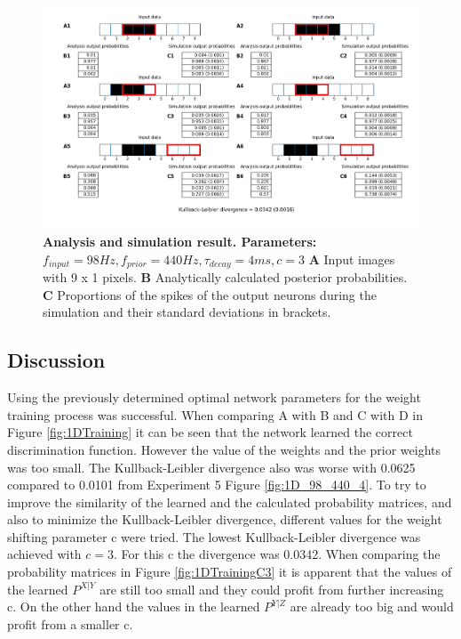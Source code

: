 \begin{figure}
  \includegraphics[width=\linewidth]{figures/1D/training/trainingEvaluation_98_440_4_c3.png}
  \caption{\textbf{Analysis and simulation result. Parameters: } $f_{input} = 98 Hz, f_{prior} = 440 Hz, \tau_{decay} = 4 ms, c = 3$ \textbf{A} Input images with 9 x 1 pixels. \textbf{B} Analytically calculated posterior probabilities. \textbf{C} Proportions of the spikes of the output neurons during the simulation and their standard deviations in brackets.}
  \label{fig:1DTrainingEvaluationC3}
\end{figure}

\subsection{Discussion}

Using the previously determined optimal network parameters for the weight training process was successful. When comparing A with B and C with D in Figure \ref{fig:1DTraining} it can be seen that the network learned the correct discrimination function. However the value of the weights and the prior weights was too small. The Kullback-Leibler divergence also was worse with 0.0625 compared to 0.0101 from Experiment 5 Figure \ref{fig:1D_98_440_4}.
To try to improve the similarity of the learned and the calculated probability matrices, and also to minimize the Kullback-Leibler divergence, different values for the weight shifting parameter c were tried. The lowest Kullback-Leibler divergence was achieved with $c = 3$. For this c the divergence was 0.0342. When comparing  the probability matrices in Figure \ref{fig:1DTrainingC3} it is apparent that the values of the learned $P^{X|Y}$ are still too small and they could profit from further increasing c. On the other hand the values in the learned $P^{Y|Z}$ are already too big and would profit from a smaller c.